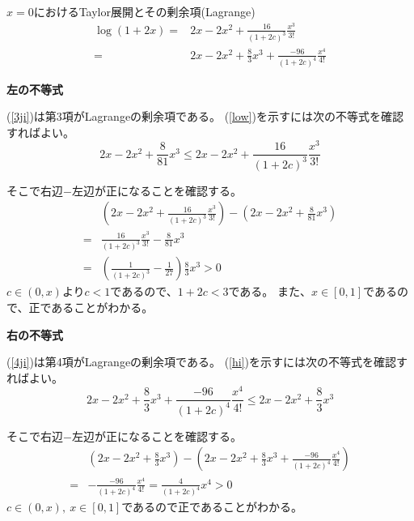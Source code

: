 \documentclass[12pt,b5paper]{ltjsarticle}
\begin{document}
$x=0$におけるTaylor展開とその剰余項(Lagrange)
\begin{align}
 \log(1+2x)
  =& 2x-2x^2+ \frac{16}{(1+2c)^3}\frac{x^3}{3!}\label{3ji}\\
  =& 2x-2x^2+\frac{8}{3}x^3 + \frac{-96}{(1+2c)^4}\frac{x^4}{4!}\label{4ji}
\end{align}

\textbf{左の不等式}

(\ref{3ji})は第3項がLagrangeの剰余項である。
(\ref{low})を示すには次の不等式を確認すればよい。
\begin{equation}
 2x-2x^2+\frac{8}{81}x^3
  \leq 2x-2x^2+ \frac{16}{(1+2c)^3}\frac{x^3}{3!}
\end{equation}

そこで右辺$-$左辺が正になることを確認する。
\begin{align}
 & \left(2x-2x^2+ \frac{16}{(1+2c)^3}\frac{x^3}{3!}\right)
 - \left(2x-2x^2+\frac{8}{81}x^3\right)\\
 =& \frac{16}{(1+2c)^3}\frac{x^3}{3!} - \frac{8}{81}x^3\\
 =& \left( \frac{1}{(1+2c)^3} - \frac{1}{27} \right)\frac{8}{3}x^3
 > 0
\end{align}
$c\in(0,x)$より$c<1$であるので、$1+2c<3$である。
また、$x\in[0,1]$であるので、正であることがわかる。


\textbf{右の不等式}

(\ref{4ji})は第4項がLagrangeの剰余項である。
(\ref{hi})を示すには次の不等式を確認すればよい。
\begin{equation}
 2x-2x^2+\frac{8}{3}x^3 + \frac{-96}{(1+2c)^4}\frac{x^4}{4!}
  \leq 2x-2x^2+\frac{8}{3}x^3
\end{equation}

そこで右辺$-$左辺が正になることを確認する。
\begin{align}
 & \left( 2x-2x^2+\frac{8}{3}x^3 \right)
 - \left( 2x-2x^2+\frac{8}{3}x^3 + \frac{-96}{(1+2c)^4}\frac{x^4}{4!}\right)\\
 =& - \frac{-96}{(1+2c)^4}\frac{x^4}{4!}
 = \frac{4}{(1+2c)^4}x^4
 > 0
\end{align}
$c\in(0,x),\ x\in[0,1]$であるので正であることがわかる。
\end{document}
